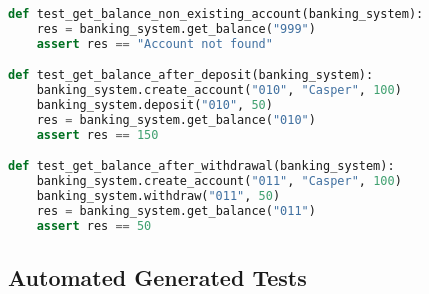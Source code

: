 \documentclass{article}
\begin{document}
\begin{lstlisting}[language=Python]
def test_get_balance_non_existing_account(banking_system):
    res = banking_system.get_balance("999")
    assert res == "Account not found"

def test_get_balance_after_deposit(banking_system):
    banking_system.create_account("010", "Casper", 100)
    banking_system.deposit("010", 50)
    res = banking_system.get_balance("010")
    assert res == 150

def test_get_balance_after_withdrawal(banking_system):
    banking_system.create_account("011", "Casper", 100)
    banking_system.withdraw("011", 50)
    res = banking_system.get_balance("011")
    assert res == 50
\end{lstlisting}

\subsection{Automated Generated Tests}
\end{document}

